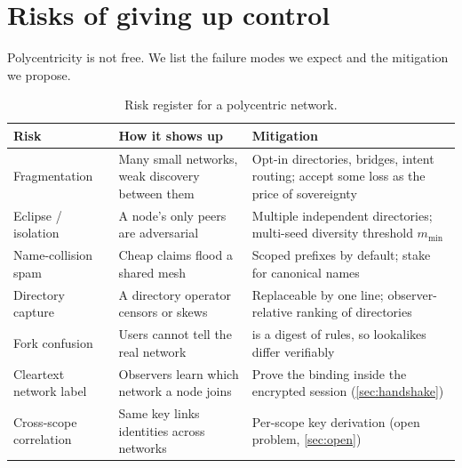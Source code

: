 \documentclass[a4paper,11pt,twoside,parskip=half-,headings=small]{scrartcl}
\begin{document}
\section{Risks of giving up control}
\label{sec:risks}

Polycentricity is not free. We list the failure modes we expect and the mitigation we propose.

\begin{table}[H]
\centering\small
\begin{tabularx}{\textwidth}{@{}L{3.1cm}YY@{}}
\toprule
\textbf{Risk} & \textbf{How it shows up} & \textbf{Mitigation} \\
\midrule
Fragmentation & Many small networks, weak discovery between them & Opt-in directories, bridges, intent routing; accept some loss as the price of sovereignty \\
Eclipse / isolation & A node's only peers are adversarial & Multiple independent directories; multi-seed diversity threshold $m_{\min}$ \\
Name-collision spam & Cheap claims flood a shared mesh & Scoped prefixes by default; stake for canonical names \\
Directory capture & A directory operator censors or skews & Replaceable by one line; observer-relative ranking of directories \\
Fork confusion & Users cannot tell the real network &  is a digest of rules, so lookalikes differ verifiably \\
Cleartext network label & Observers learn which network a node joins & Prove the binding inside the encrypted session (\cref{sec:handshake}) \\
Cross-scope correlation & Same key links identities across networks & Per-scope key derivation (open problem, \cref{sec:open}) \\
\bottomrule
\end{tabularx}
\caption{Risk register for a polycentric network.}
\end{table}

\end{document}
